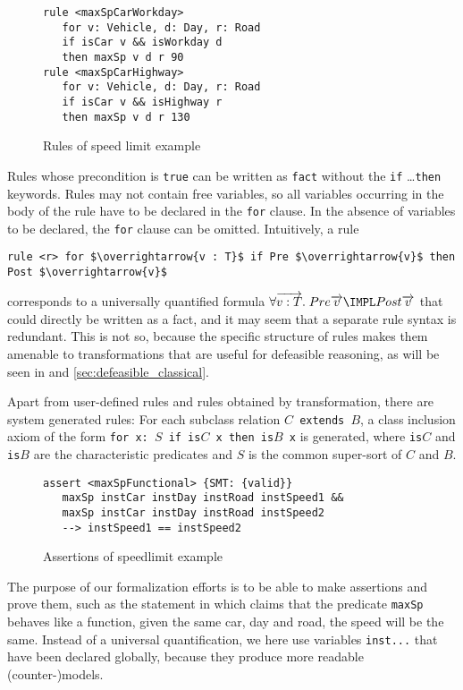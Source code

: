 \begin{figure}[h!]
  \begin{lstlisting}
rule <maxSpCarWorkday> 
   for v: Vehicle, d: Day, r: Road
   if isCar v && isWorkday d
   then maxSp v d r 90
rule <maxSpCarHighway>
   for v: Vehicle, d: Day, r: Road
   if isCar v && isHighway r
   then maxSp v d r 130
\end{lstlisting}
  \caption{Rules of speed limit example}\label{fig:rules}
\end{figure}

Rules whose precondition is \texttt{true} can be written as \texttt{fact}
without the \texttt{if} \dots \texttt{then} keywords.
Rules may not contain free variables, so all variables occurring in the body of
the rule have to be declared in the \texttt{for} clause. In the absence of
variables to be declared, the \texttt{for} clause can be omitted. 
Intuitively, a rule
\begin{lstlisting}[frame=none,mathescape=true]
  rule <r> for $\overrightarrow{v : T}$ if Pre $\overrightarrow{v}$ then Post $\overrightarrow{v}$
\end{lstlisting}
corresponds to a universally quantified formula
$\forall \overrightarrow{v : T}.\; Pre \overrightarrow{v}
\IMPL Post \overrightarrow{v}$ that could directly be written as a fact,
and it may seem that a separate rule syntax is redundant. This is not so,
because the specific structure of rules makes them amenable to transformations
that are useful for defeasible reasoning, as will be seen in
 and \ref{sec:defeasible_classical}.

Apart from user-defined rules and rules obtained by transformation, there are
system generated rules: For each subclass relation \texttt{$C$ extends $B$}, a
class inclusion axiom of the form \texttt{for x: $S$ if is$C$ x then is$B$ x}
is generated, where \texttt{is$C$} and \texttt{is$B$} are the characteristic
predicates and $S$ is the common super-sort of $C$ and $B$.

\begin{figure}[h]
\begin{lstlisting}
assert <maxSpFunctional> {SMT: {valid}}
   maxSp instCar instDay instRoad instSpeed1 &&
   maxSp instCar instDay instRoad instSpeed2
   --> instSpeed1 == instSpeed2
\end{lstlisting}
  \caption{Assertions of speedlimit example}\label{fig:assertions}
\end{figure}


The purpose of our formalization efforts is to be able to make assertions
and prove them, such as the statement in  which claims
that the predicate 
\texttt{maxSp} behaves like a function, \ie{} given the same car, day and
road, the speed will be the same. Instead of a universal quantification, we
here use variables \texttt{inst...} that have been declared globally, because they
produce more readable (counter-)models. 


